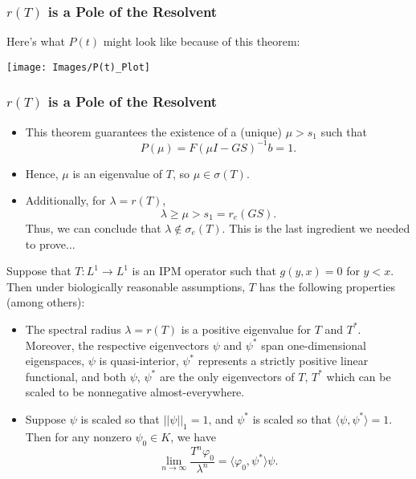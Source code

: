 \documentclass{beamer}
\begin{document}
\begin{frame}
	\frametitle{$r(T)$ is a Pole of the Resolvent}
	Here's what $P(t)$ might look like because of this theorem:
\begin{center}
	\texttt{[image: Images/P(t)\_Plot]}
\end{center}
\end{frame}

\begin{frame}
	\frametitle{$r(T)$ is a Pole of the Resolvent}
	\begin{itemize}
		\item This theorem guarantees the existence of a (unique) $\mu > s_1$ such that
		\[P(\mu) = F(\mu I - GS)^{-1}b = 1.\]
		\vspace*{-\baselineskip}
		\pause
		\item Hence, $\mu$ is an eigenvalue of $T$, so $\mu \in \sigma(T)$.
		\pause
		\item Additionally, for $\lambda = r(T)$,
		\[\lambda \geq \mu > s_1 = r_e(GS).\]
		\pause
		Thus, we can conclude that $\lambda \not \in \sigma_e(T)$. This is the last ingredient we needed to prove...
	\end{itemize}
\end{frame}

\begin{frame}
	\begin{theorem}[R., 2020]
	Suppose that $T:L^1 \to L^1$ is an IPM operator such that $g(y, x) = 0$ for $y < x$. Then under biologically reasonable assumptions, $T$ has the following properties (among others):
	\pause
	\begin{itemize}
		\item The spectral radius $\lambda = r(T)$ is a positive eigenvalue for $T$ and $T^*$. Moreover, the respective eigenvectors $\psi$ and $\psi^*$ span one-dimensional eigenspaces, $\psi$ is quasi-interior, $\psi^*$ represents a strictly positive linear functional, and both $\psi$, $\psi^*$ are the only eigenvectors of $T$, $T^*$ which can be scaled to be nonnegative almost-everywhere.
		\pause
		\item Suppose $\psi$ is scaled so that $||\psi||_1 = 1$, and $\psi^*$ is scaled so that $\langle \psi, \psi^* \rangle = 1$. Then for any nonzero $\psi_0 \in K$, we have
		\[\lim_{n \to \infty} \frac{T^n \varphi_0}{\lambda^n} = \langle \varphi_0, \psi^* \rangle \psi.\]			
	\end{itemize}
	\end{theorem}
\end{frame}
\end{document}
